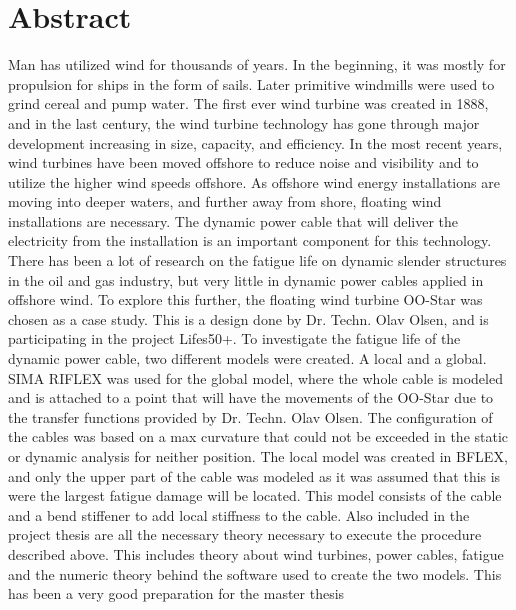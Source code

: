 \chapter*{Abstract}
Man has utilized wind for thousands of years. In the beginning, it was mostly for propulsion for ships in the form of sails. Later primitive windmills were used to grind cereal and pump water. The first ever wind turbine was created in 1888, and in the last century, the wind turbine technology has gone through major development increasing in size, capacity, and efficiency. In the most recent years, wind turbines have been moved offshore to reduce noise and visibility and to utilize the higher wind speeds offshore. As offshore wind energy installations are moving into deeper waters, and further away from shore, floating wind installations are necessary. The dynamic power cable that will deliver the electricity from the installation is an important component for this technology. There has been a lot of research on the fatigue life on dynamic slender structures in the oil and gas industry, but very little in dynamic power cables applied in offshore wind. \newline
\newline
 To explore this further, the floating wind turbine OO-Star was chosen as a case study. This is a design done by Dr. Techn. Olav Olsen, and is participating in the project Lifes50+. To investigate the fatigue life of the dynamic power cable, two different models were created. A local and a global. SIMA RIFLEX was used for the global model, where the whole cable is modeled and is attached to a point that will have the movements of the OO-Star due to the transfer functions provided by Dr. Techn. Olav Olsen. The configuration of the cables was based on a max curvature that could not be exceeded in the static or dynamic analysis for neither position. The local model was created in BFLEX, and only the upper part of the cable was modeled as it was assumed that this is were the largest fatigue damage will be located. This model consists of the cable and a bend stiffener to add local stiffness to the cable.\newline 
\newline
Also included in the project thesis are all the necessary theory necessary to execute the procedure described above. This includes theory about wind turbines, power cables, fatigue and the numeric theory behind the software used to create the two models. This has been a very good preparation for the master thesis
